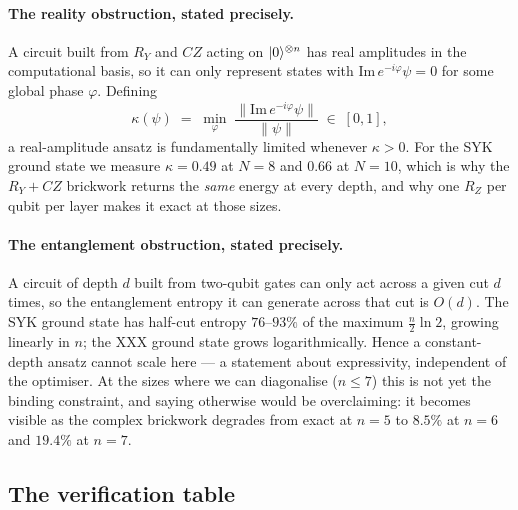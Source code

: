 \paragraph{The reality obstruction, stated precisely.}
A circuit built from $R_Y$ and $CZ$ acting on $\lvert 0 \rangle^{\otimes n}$ has real
amplitudes in the computational basis, so it can only represent states with
$\mathrm{Im}\,e^{-i\varphi}\psi = 0$ for some global phase $\varphi$. Defining
\begin{equation}
  \kappa(\psi) \;=\; \min_{\varphi}\;
  \frac{\big\|\mathrm{Im}\,e^{-i\varphi}\psi\big\|}{\|\psi\|}
  \;\in\;[0,1],
\end{equation}
a real-amplitude ansatz is fundamentally limited whenever $\kappa>0$. For the
SYK ground state we measure $\kappa = 0.49$ at $N=8$ and $0.66$ at $N=10$,
which is why the $R_Y+CZ$ brickwork returns the \emph{same} energy at every
depth, and why one $R_Z$ per qubit per layer makes it exact at those sizes.

\paragraph{The entanglement obstruction, stated precisely.}
A circuit of depth $d$ built from two-qubit gates can only act across a given
cut $d$ times, so the entanglement entropy it can generate across that cut is
$O(d)$. The SYK ground state has half-cut entropy $76$--$93\%$ of the maximum
$\tfrac n2\ln 2$, growing linearly in $n$; the XXX ground state grows
logarithmically. Hence a constant-depth ansatz cannot scale here --- a
statement about expressivity, independent of the optimiser. At the sizes where
we can diagonalise ($n\le 7$) this is not yet the binding constraint, and
saying otherwise would be overclaiming: it becomes visible as the complex
brickwork degrades from exact at $n=5$ to $8.5\%$ at $n=6$ and $19.4\%$ at
$n=7$.

\subsection{The verification table}

\begin{center}\scriptsize

\label{tab:derivs}
\end{center}
